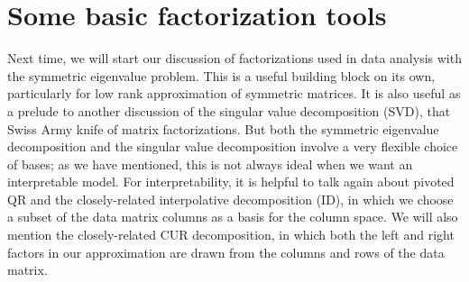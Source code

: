 \documentclass[12pt, leqno]{article} %
\begin{document}
\section{Some basic factorization tools}

Next time, we will start our discussion of factorizations used in data analysis
with the symmetric eigenvalue problem.  This is a useful building
block on its own, particularly for low rank approximation of symmetric
matrices.  It is also useful as a prelude to another discussion of
the singular value decomposition (SVD), that Swiss Army knife of
matrix factorizations.  But both the symmetric eigenvalue decomposition
and the singular value decomposition involve a very flexible choice
of bases; as we have mentioned, this is not always ideal when we want
an interpretable model.  For interpretability, it is helpful to talk
again about pivoted QR and the closely-related interpolative
decomposition (ID), in which we choose a subset of the data matrix
columns as a basis for the column space.  We will also mention
the closely-related CUR decomposition, in which both the left and right
factors in our approximation are drawn from the columns and rows of
the data matrix.
\end{document}
